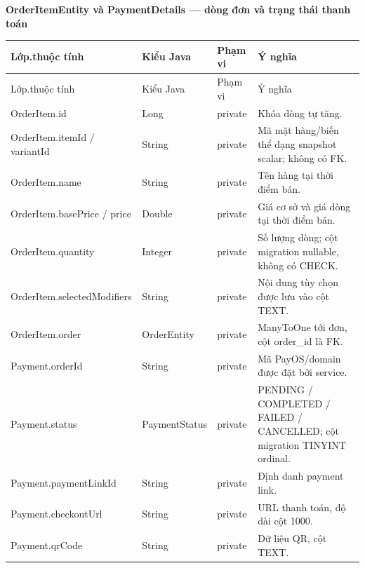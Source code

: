 \documentclass[12pt,a4paper,oneside]{report}
\newcommand{\ClassTableTitle}[1]{\par\medskip\noindent\textbf{#1}\par\smallskip}
\begin{document}
\ClassTableTitle{OrderItemEntity và PaymentDetails — dòng đơn và trạng thái thanh toán}
\small\begin{longtable}{@{}D{3.25cm}D{3.35cm}D{1.35cm}D{6.75cm}@{}}\toprule Lớp.thuộc tính & Kiểu Java & Phạm vi & Ý nghĩa\\\midrule\endfirsthead\toprule Lớp.thuộc tính & Kiểu Java & Phạm vi & Ý nghĩa\\\midrule\endhead\bottomrule\endfoot
OrderItem.\allowbreak id & Long & private & Khóa dòng tự tăng.\\OrderItem.\allowbreak itemId / variantId & String & private & Mã mặt hàng/biến thể dạng snapshot scalar; không có FK.\\OrderItem.\allowbreak name & String & private & Tên hàng tại thời điểm bán.\\OrderItem.\allowbreak basePrice / price & Double & private & Giá cơ sở và giá dòng tại thời điểm bán.\\OrderItem.\allowbreak quantity & Integer & private & Số lượng dòng; cột migration nullable, không có CHECK.\\OrderItem.\allowbreak selectedModifiers & String & private & Nội dung tùy chọn được lưu vào cột TEXT.\\OrderItem.\allowbreak order & OrderEntity & private & ManyToOne tới đơn, cột order\_id là FK.\\Payment.\allowbreak orderId & String & private & Mã PayOS/domain được đặt bởi service.\\Payment.\allowbreak status & PaymentStatus & private & PENDING / COMPLETED / FAILED / CANCELLED; cột migration TINYINT ordinal.\\Payment.\allowbreak paymentLinkId & String & private & Định danh payment link.\\Payment.\allowbreak checkoutUrl & String & private & URL thanh toán, độ dài cột 1000.\\Payment.\allowbreak qrCode & String & private & Dữ liệu QR, cột TEXT.\\\end{longtable}\normalsize
\end{document}
